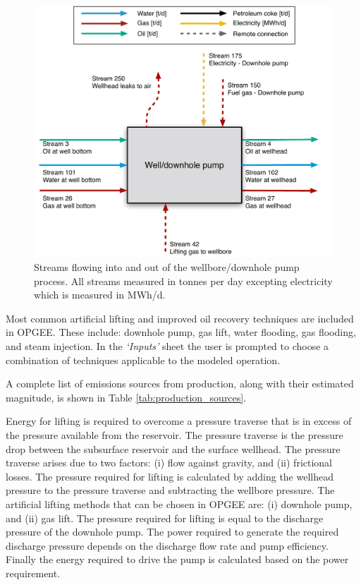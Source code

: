 \documentclass[11pt]{report}
\newcommand{\sheet}[1]{\textit{`{#1}'}}
\begin{document}
\begin{figure}
\includegraphics[width=0.85\columnwidth]{images/Wellbore_downhole_pump_PF.pdf}
\caption{Streams flowing into and out of the wellbore/downhole pump process. All streams measured in tonnes per day excepting electricity which is measured in MWh/d.}
\label{fig:wellbore_PF}
\end{figure}




\clearpage

Most common artificial lifting and improved oil recovery techniques are included in OPGEE. These include: downhole pump, gas lift, water flooding, gas flooding, and steam injection. In the \sheet{Inputs} sheet the user is prompted to choose a combination of techniques applicable to the modeled operation. 

A complete list of emissions sources from production, along with their estimated magnitude, is shown in Table \ref{tab:production_sources}.

Energy for lifting is required to overcome a pressure traverse that is in excess of the pressure available from the reservoir. The pressure traverse is the pressure drop between the subsurface reservoir and the surface wellhead. The pressure traverse arises due to two factors: (i) flow against gravity, and (ii) frictional losses. The pressure required for lifting is calculated by adding the wellhead pressure to the pressure traverse and subtracting the wellbore pressure. The artificial lifting methods that can be chosen in OPGEE are: (i) downhole pump, and (ii) gas lift. The pressure required for lifting is equal to the discharge pressure of the downhole pump. The power required to generate the required discharge pressure depends on the discharge flow rate and pump efficiency. Finally the energy required to drive the pump is calculated based on the power requirement. 
\end{document}
